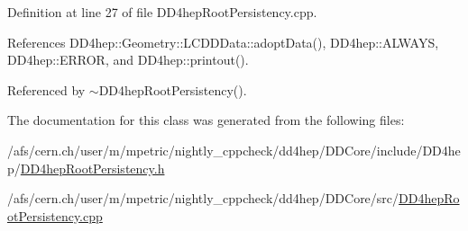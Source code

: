 Definition at line 27 of file D\+D4hep\+Root\+Persistency.\+cpp.



References D\+D4hep\+::\+Geometry\+::\+L\+C\+D\+D\+Data\+::adopt\+Data(), D\+D4hep\+::\+A\+L\+W\+A\+YS, D\+D4hep\+::\+E\+R\+R\+OR, and D\+D4hep\+::printout().



Referenced by $\sim$\+D\+D4hep\+Root\+Persistency().



The documentation for this class was generated from the following files\+:\begin{DoxyCompactItemize}
\item 
/afs/cern.\+ch/user/m/mpetric/nightly\+\_\+cppcheck/dd4hep/\+D\+D\+Core/include/\+D\+D4hep/\hyperlink{_d_d4hep_root_persistency_8h}{D\+D4hep\+Root\+Persistency.\+h}\item 
/afs/cern.\+ch/user/m/mpetric/nightly\+\_\+cppcheck/dd4hep/\+D\+D\+Core/src/\hyperlink{_d_d4hep_root_persistency_8cpp}{D\+D4hep\+Root\+Persistency.\+cpp}\end{DoxyCompactItemize}
